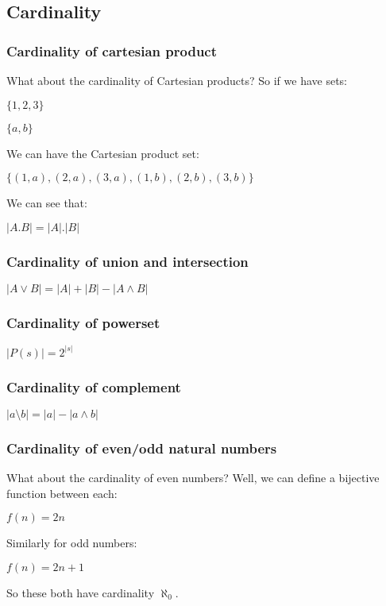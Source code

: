 \subsection{Cardinality}

\subsubsection{Cardinality of cartesian product}

What about the cardinality of Cartesian products? So if we have sets:

$\{1,2,3\}$

$\{a,b\}$

We can have the Cartesian product set:

$\{(1,a),(2,a),(3,a),(1,b),(2,b),(3,b)\}$

We can see that:

$|A.B|=|A|.|B|$
\subsubsection{Cardinality of union and intersection}

$|A\lor B| = |A|+|B|-|A\land B|$
\subsubsection{Cardinality of powerset}

$|P(s)|=2^{|s|}$

\subsubsection{Cardinality of complement}

$|a \setminus b|=|a|-|a\land b|$

\subsubsection{Cardinality of even/odd natural numbers}

What about the cardinality of even numbers? Well, we can define a bijective function between each:

$f(n)=2n$

Similarly for odd numbers:

$f(n)=2n+1$

So these both have cardinality \(\aleph_0\).


